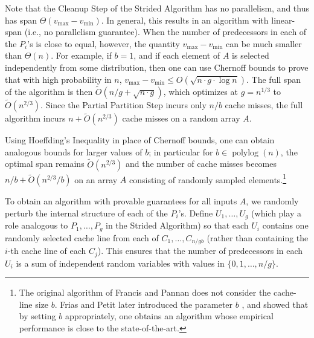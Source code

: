 \documentclass[11pt]{article}
\renewcommand{\paragraph}[1]{\vspace{0.09in}\noindent{\bf \boldmath #1.}}
\theoremstyle{remark}
\theoremstyle{remark}
\begin{document}
Note that the Cleanup Step of the Strided Algorithm has no
parallelism, and thus has span $\Theta(v_{\text{max}} -
v_{\text{min}})$.  In general, this results in an algorithm with
linear-span (i.e., no parallelism guarantee).  When the number of
predecessors in each of the $P_i$'s is close to equal, however, the
quantity $v_{\text{max}} - v_{\text{min}}$ can be much smaller than
$\Theta(n)$.  For example, if $b = 1$, and if each element of $A$ is
selected independently from some distribution, then one can use
Chernoff bounds to prove that with high probability in $n$,
$v_{\text{max}} - v_{\text{min}} \le O(\sqrt{n \cdot g \cdot \log
  n})$.  The full span of the algorithm is then $\tilde{O}(n/g +
\sqrt{n \cdot g})$, which optimizes at $g = n^{1/3}$ to
$\tilde{O}(n^{2/3})$. Since the Partial Partition Step incurs only $n
/ b$ cache misses, the full algorithm incurs $n + \tilde{O}(n^{2/3})$ cache
misses on a random array $A$.


Using Hoeffding's Inequality in place of Chernoff bounds, one can
obtain analogous bounds for larger values of $b$; in particular for $b
\in \operatorname{polylog}(n)$, the optimal span remains
$\tilde{O}(n^{2/3})$ and the number of cache misses becomes $n / b +
\tilde{O}(n^{2/3} / b)$ on an array $A$ consisting of randomly sampled
elements.\footnote{The original algorithm of Francis and Pannan
  \cite{FrancisPa92} does not consider the cache-line size $b$. Frias
  and Petit later introduced the parameter $b$ \cite{Frias08}, and
  showed that by setting $b$ appropriately, one obtains an algorithm
  whose empirical performance is close to the state-of-the-art.}



\paragraph{The Smoothed Striding Algorithm}
To obtain an algorithm with provable guarantees for all inputs $A$, we
randomly perturb the internal structure of each of the $P_i$'s. Define
$U_1, \ldots, U_{g}$ (which play a role analogous to $P_1,
\ldots, P_g$ in the Strided Algorithm) so that each $U_i$ contains one
randomly selected cache line from each of $C_1, \ldots, C_{n /
  gb}$ (rather than containing the $i$-th cache line of each
$C_j$). This ensures that the number of predecessors in each $U_i$ is
a sum of independent random variables with values in $\{0, 1, \ldots,
n/g\}$.
\end{document}
